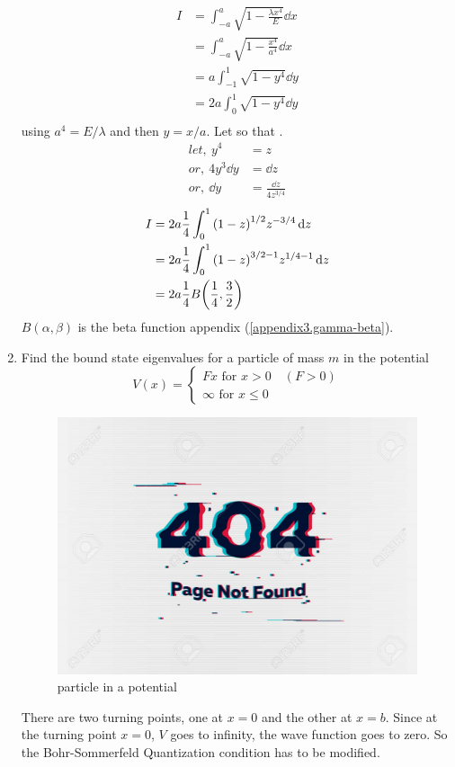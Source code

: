 \begin{enumerate}
\begin{align*}
		I &= \int_{-a}^{a} \sqrt{1 - \frac{\lambda x^4}{E}} \dd{x} \\
		&= \int_{-a}^{a} \sqrt{1 - \frac{x^4}{a^4}} \dd{x} \\
		&= a \int_{-1}^{1} \sqrt{1 - y^4} \dd{y} \\
		&= 2 a \int_{0}^{1} \sqrt{1 - y^4} \dd{y} \\
	\end{align*}
	using $a^4 = E/\lambda$ and then $y=x/a$.
	Let  so that .
	\begin{align*}
		let,\		y^4 &= z \\
or,\		4 y^3 \dd{y} &= \dd{z} \\
or,\ \dd{y} &= \frac{\dd{z}}{4 z^{3/4}}
	\end{align*}
	\begin{align*}
	I 
	&= 2 a \frac{1}{4}\int_{0}^{1} \qty(1 - z)^{1/2} z^{-3/4} \dd{z} \\
	&= 2 a \frac{1}{4}\int_{0}^{1} \qty(1 - z)^{3/2-1} z^{1/4 - 1} \dd{z} \\
	&= 2 a \frac{1}{4} B\qty(\frac{1}{4}, \frac{3}{2})
	\end{align*}
	$B(\alpha,\beta)$ is the beta function appendix (\ref{appendix3.gamma-beta}).


	
	
	\item Find the bound state eigenvalues for a particle of mass $m$ in the potential
	\begin{equation}
		V(x) = \begin{cases}
			F x \text{ for } x> 0 \quad (F > 0) \\
			\infty \text{ for } x \leq 0
		\end{cases}
	\end{equation}
		\begin{figure}
		\centering
		\includegraphics[width=0.5\linewidth]{Pictures/not-found.jpg}
		\caption{particle in a potential}
		\label{chapter22.fig8}
	\end{figure}
	
	
	There are two turning points, one at $x=0$ and the other at $x=b$. Since at the turning point $x=0$, $V$ goes to infinity, the wave function goes to zero. So the Bohr-Sommerfeld Quantization condition has to be modified. 
	

\end{enumerate}
